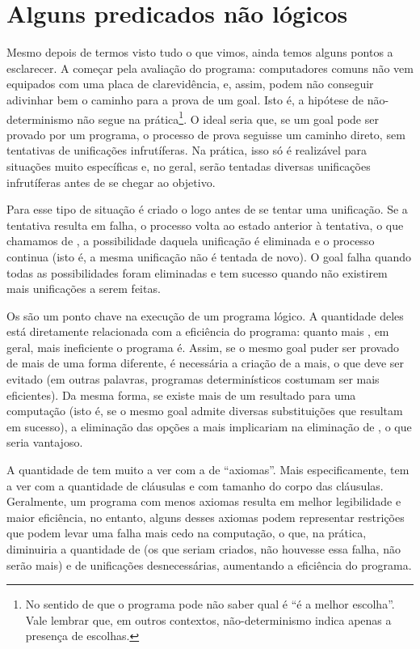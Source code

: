 \documentclass{article}
\begin{document}
\section{Alguns predicados não lógicos}

Mesmo depois de termos visto tudo o que vimos, ainda temos alguns pontos a esclarecer. A começar pela avaliação do programa: computadores comuns não vem equipados com uma placa de clarevidência, e, assim, podem não conseguir adivinhar bem o caminho para a prova de um goal. Isto é, a hipótese de não-determinismo não segue na prática\footnote{No sentido de que o programa pode não saber qual é ``é a melhor escolha''. Vale lembrar que, em outros contextos, não-determinismo indica apenas a
  presença de escolhas. }. O ideal seria que, se um goal pode ser provado por um programa, o processo de prova seguisse um caminho direto, sem tentativas de unificações infrutíferas. Na prática, isso só é realizável para situações muito específicas e, no geral, serão tentadas
diversas unificações infrutíferas antes de se chegar ao objetivo.

Para esse tipo de situação é criado o  logo antes de se tentar uma unificação. Se a tentativa resulta em falha, o processo volta ao estado anterior à tentativa, o que chamamos de , a possibilidade daquela unificação é eliminada e o processo continua (isto é, a mesma unificação não é tentada de novo). O goal falha quando todas as possibilidades foram eliminadas e tem sucesso quando não existirem mais unificações a serem feitas.

Os  são um ponto chave na execução de um programa lógico. A quantidade deles está diretamente relacionada com a eficiência do programa: quanto mais , em geral, mais ineficiente o programa é. Assim, se o mesmo goal puder ser provado de mais de uma forma diferente, é necessária a criação de  a mais, o que deve ser evitado (em outras palavras, programas determinísticos costumam ser mais eficientes). Da mesma forma, se existe mais
de um resultado para uma computação (isto é, se o mesmo goal admite diversas substituições que resultam em sucesso), a eliminação das opções a mais implicariam na eliminação de , o que seria vantajoso.

A quantidade de  tem muito a ver com a de ``axiomas''. Mais especificamente, tem a ver com a quantidade de cláusulas e com tamanho do corpo das cláusulas. Geralmente, um programa com menos axiomas resulta em melhor legibilidade e maior eficiência, no entanto, alguns desses axiomas podem representar restrições que podem levar uma falha mais cedo na computação, o que, na prática, diminuiria a quantidade de  (os que seriam criados, não houvesse essa
falha, não serão mais) e de unificações
desnecessárias, aumentando a eficiência do programa.
\end{document}
